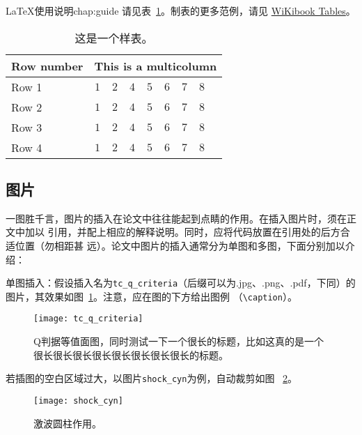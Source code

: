 \begin{cuzchapter}{\LaTeX{}使用说明}{chap:guide}
请见表~\ref{tab:sample}。制表的更多范例，请见
\href{https://en.wikibooks.org/wiki/LaTeX/Tables}{WiKibook Tables}。
\begin{table}[!htbp]
    \caption[样表]{这是一个样表。}
    \label{tab:sample}
    \centering
    \footnotesize%
    \setlength{\tabcolsep}{4pt}%
    \renewcommand{\arraystretch}{1.2}%
    \begin{tabular}{lcccccccc}
        \hline
        Row number & \multicolumn{8}{c}{This is a multicolumn} \\
        \hline
        Row 1 & $1$ & $2$ & $4$ & $5$ & $6$ & $7$ & $8$\\
        Row 2 & $1$ & $2$ & $4$ & $5$ & $6$ & $7$ & $8$\\
        Row 3 & $1$ & $2$ & $4$ & $5$ & $6$ & $7$ & $8$\\
        Row 4 & $1$ & $2$ & $4$ & $5$ & $6$ & $7$ & $8$\\
        \hline
    \end{tabular}
\end{table}

\subsection{图片}\label{sub:images}

一图胜千言，图片的插入在论文中往往能起到点睛的作用。在插入图片时，须在正文中加以
引用，并配上相应的解释说明。同时，应将代码放置在引用处的后方合适位置（勿相距甚
远）。论文中图片的插入通常分为单图和多图，下面分别加以介绍：

单图插入：假设插入名为\verb|tc_q_criteria|（后缀可以为.jpg、.png、.pdf，下同）的
图片，其效果如图~\ref{fig:tc_q_criteria}。注意，应在图的下方给出图例
（\verb|\caption|）。
\begin{figure}[!htbp]
    \centering
    \texttt{[image: tc\_q\_criteria]}
    \caption[Q判据等值面图]{Q判据等值面图，同时测试一下一个很长的标题，比如这真的是一个很长很长很长很长很长很长很长很长的标题。}
    \label{fig:tc_q_criteria}
\end{figure}

若插图的空白区域过大，以图片\verb|shock_cyn|为例，自动裁剪如图
~\ref{fig:shock_cyn}。
\begin{figure}[!htbp]
    \centering
    \texttt{[image: shock\_cyn]}
    \caption[激波圆柱作用]{激波圆柱作用。}
    \label{fig:shock_cyn}
\end{figure}


\end{cuzchapter}
